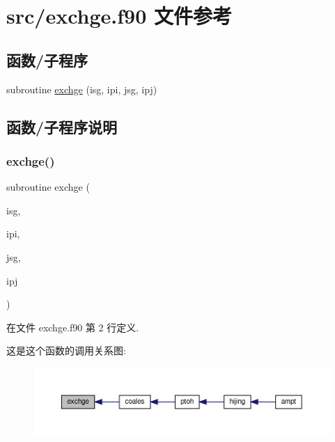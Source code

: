 \hypertarget{exchge_8f90}{}\section{src/exchge.f90 文件参考}
\label{exchge_8f90}
\subsection*{函数/子程序}
\begin{DoxyCompactItemize}
\item 
subroutine \mbox{\hyperlink{exchge_8f90_a7becfda1343d5e34c5d9c876d5949e1c}{exchge}} (isg, ipi, jsg, ipj)
\end{DoxyCompactItemize}


\subsection{函数/子程序说明}
\mbox{\label{exchge_8f90_a7becfda1343d5e34c5d9c876d5949e1c}} 
\subsubsection{\texorpdfstring{exchge()}{exchge()}}
{\footnotesize\ttfamily subroutine exchge (\begin{DoxyParamCaption}\item[{}]{isg,  }\item[{}]{ipi,  }\item[{}]{jsg,  }\item[{}]{ipj }\end{DoxyParamCaption})}



在文件 exchge.\+f90 第 2 行定义.

这是这个函数的调用关系图\+:
\nopagebreak
\begin{figure}[H]
\begin{center}
\leavevmode
\includegraphics[width=350pt]{exchge_8f90_a7becfda1343d5e34c5d9c876d5949e1c_icgraph}
\end{center}
\end{figure}
